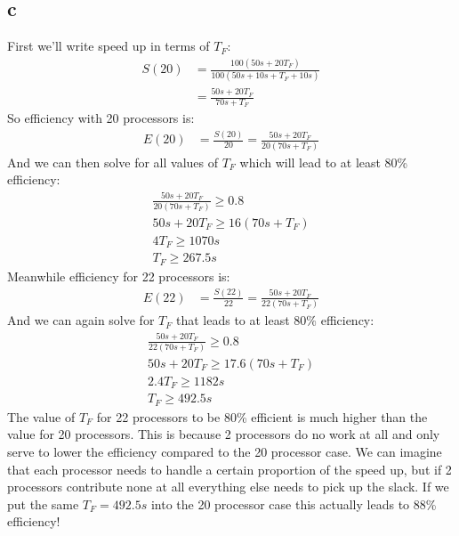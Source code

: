 \documentclass[12pt]{article}
\begin{document}
\subsection{c}
First we'll write speed up in terms of $T_F$:
\begin{align*}
S(20) & = \frac{100(50s + 20T_F)}{100(50s + 10s + T_F + 10s)}\\
& = \frac{50s + 20T_F}{70s + T_F}
\end{align*}
So efficiency with 20 processors is:
\begin{align*}
E(20) & = \frac{S(20)}{20} = \frac{50s + 20T_F}{20(70s + T_F)}
\end{align*}
And we can then solve for all values of $T_F$ which will lead to at least 80\% efficiency:
\begin{align*}
\frac{50s + 20T_F}{20(70s + T_F)} \ge 0.8\\
50s + 20T_F \ge 16(70s + T_F)\\
4T_F \ge 1070s\\
T_F \ge 267.5s
\end{align*}
Meanwhile efficiency for 22 processors is:
\begin{align*}
E(22) & = \frac{S(22)}{22} = \frac{50s + 20T_F}{22(70s + T_F)}
\end{align*}
And we can again solve for $T_F$ that leads to at least 80\% efficiency:
\begin{align*}
\frac{50s + 20T_F}{22(70s + T_F)} \ge 0.8\\
50s + 20T_F \ge 17.6(70s + T_F)\\
2.4T_F \ge 1182s\\
T_F \ge 492.5s
\end{align*}
The value of $T_F$ for 22 processors to be 80\% efficient is much higher than the value for 20 processors.  This is because 2 processors do no work at all and only serve to lower the efficiency compared to the 20 processor case.  We can imagine that each processor needs to handle a certain proportion of the speed up, but if 2 processors contribute none at all everything else needs to pick up the slack.  If we put the same $T_F=492.5s$ into the 20 processor case this actually leads to 88\% efficiency!
\end{document}

